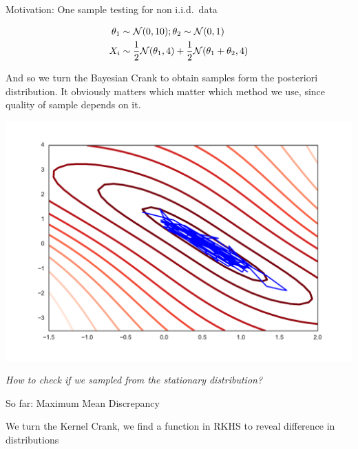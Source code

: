 


\begin{frame}
\begin{columns}
\begin{column}{.33\linewidth}
\begin{block}{Motivation: One sample testing for non i.i.d.\ data}
\begin{minipage}{.49\linewidth}

\begin{align*}
 \theta_{1}&\sim{\cal N}(0,10);\theta_{2}\sim{\cal N}(0,1) \\
 X_{i} &\sim\frac{1}{2}{\cal N}(\theta_{1},4)+\frac{1}{2}{\cal N}(\theta_{1}+\theta_{2},4)
\end{align*}
 \vspace{1cm} 

And so we turn the Bayesian Crank  to  obtain samples form the posteriori distribution. It obviously matters which matter which method we use, since quality of sample depends on it. 
\end{minipage}
\begin{minipage}{.4\linewidth}
\includegraphics[scale=0.7]{../../presentation/img/sgld_trace_and_density.pdf}
\end{minipage}
\vspace{1cm}
\begin{center}
\Large
\emph{How to check if we sampled from the stationary distribution?}
\end{center}
\end{block}
\vspace{-0.75cm}
\begin{block}{So far: Maximum Mean Discrepancy}
\begin{center}We turn the Kernel Crank, we find a function in RKHS to reveal difference in distributions\end{center}
\begin{minipage}{.60\linewidth}



\end{minipage}
\end{block}
\end{column}
\end{columns}
\end{frame}
